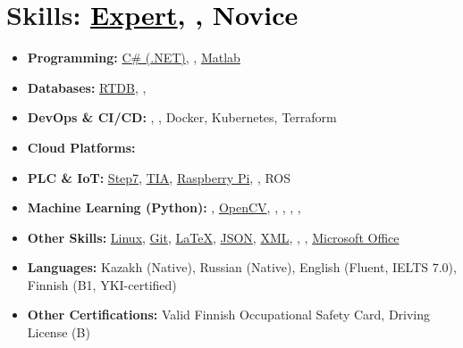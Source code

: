 \documentclass[a4paper,10pt]{article}
\begin{document}
\section*{Skills: \small\textcolor{black}{\uline{Expert}, , Novice}}
\begin{itemize}
    \item \textbf{Programming:} 
      \uline{C\# (.NET)}, 
      , 
      \uline{Matlab}
    \item \textbf{Databases:} 
      \uline{RTDB},
      , 
    \item \textbf{DevOps \& CI/CD:} 
      , 
      , 
      Docker, 
      Kubernetes, 
      Terraform
    \item \textbf{Cloud Platforms:} 
    \item \textbf{PLC \& IoT:} 
      \uline{Step7}, 
      \uline{TIA}, 
      \uline{Raspberry Pi}, 
      ,
      ROS
    \item \textbf{Machine Learning (Python):} 
      , 
      \uline{OpenCV}, 
      , 
      , 
      , 
      , 
    \item \textbf{Other Skills:} 
      \uline{Linux}, 
      \uline{Git}, 
      \uline{LaTeX}, 
      \uline{JSON}, 
      \uline{XML}, 
      ,
      ,
      \uline{Microsoft Office}
    \item \textbf{Languages:} Kazakh (Native), Russian (Native), English (Fluent, IELTS 7.0), Finnish (B1, YKI-certified)
    \item \textbf{Other Certifications:} Valid Finnish Occupational Safety Card, Driving License (B)
\end{itemize}
\end{document}
